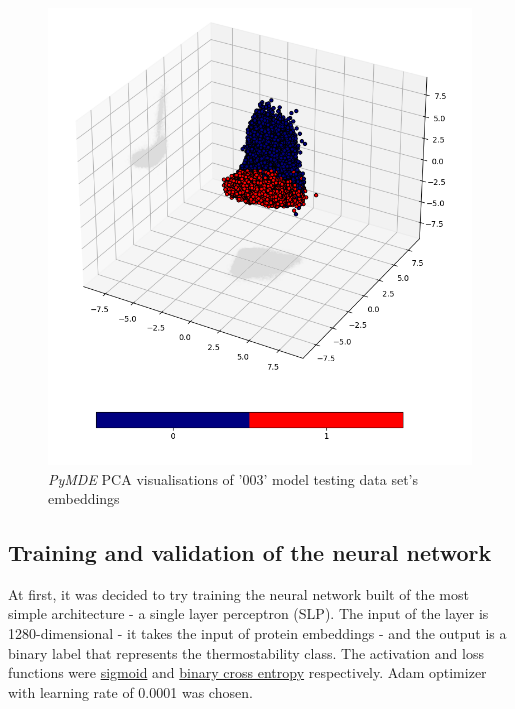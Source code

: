 \documentclass[12pt]{article}
\begin{document}
	\begin{figure}[h!]
		\centering
		\includegraphics[scale=0.5]{003_test_v2_MDE_PCA.png}

		\caption{\textit{PyMDE} PCA visualisations of '003' model 
		testing data set's embeddings}
		\label{figure:testingPyMDEPCAembeddings003}
	\end{figure}

	\pagebreak

	\subsection{Training and validation of the neural network}

	At first, it was decided to try training the neural network built of
	the most simple architecture - a single layer perceptron (SLP). The input of the 
	layer is 1280-dimensional - it takes the input of protein embeddings - and the 
	output is a binary label that represents the thermostability class. The 
	activation and loss functions were 
	\href{https://pytorch.org/docs/stable/generated/torch.nn.Sigmoid.html}{sigmoid} 
	and 
	\href{https://pytorch.org/docs/stable/generated/torch.nn.BCELoss.html}{binary cross entropy} 
	respectively. 
	Adam optimizer \cite{kingma2014adam} 
	with learning rate of 0.0001 was chosen.
\end{document}

